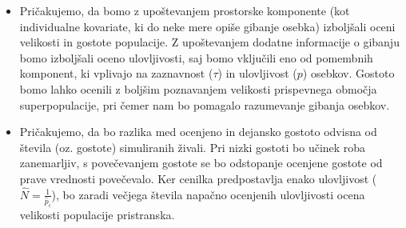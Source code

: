 \documentclass[a4paper]{article}
\begin{document}


\begin{itemize}
\item Pričakujemo, da bomo z upoštevanjem prostorske komponente (kot individualne kovariate, ki do neke mere opiše gibanje osebka) izboljšali oceni velikosti in gostote populacije. Z upoštevanjem dodatne informacije o gibanju bomo izboljšali oceno ulovljivosti, saj bomo vključili eno od pomembnih komponent, ki vplivajo na zaznavnost ($\tau$) in ulovljivost ($p$) osebkov. Gostoto bomo lahko ocenili z boljšim poznavanjem velikosti prispevnega območja superpopulacije, pri čemer nam bo pomagalo razumevanje gibanja osebkov.
 

\item Pričakujemo, da bo razlika med ocenjeno in dejansko gostoto odvisna od števila (oz. gostote) simuliranih živali. Pri nizki gostoti bo učinek roba zanemarljiv, s povečevanjem gostote se bo odstopanje ocenjene gostote od prave vrednosti povečevalo. Ker cenilka predpostavlja enako ulovljivost ($\hat{N} = \frac{1}{\hat{p}_i}$), bo zaradi večjega števila napačno ocenjenih ulovljivosti ocena velikosti populacije pristranska. %
\end{itemize}
\end{document}
